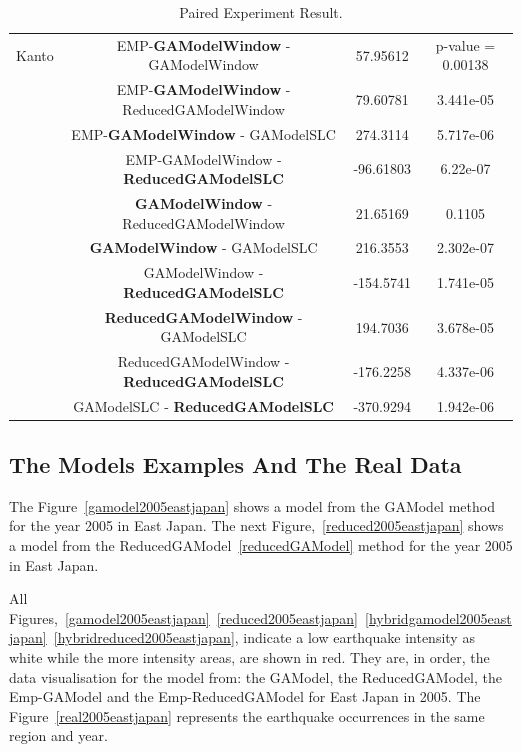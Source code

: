 \begin{table}[!htb]
\begin{center}
\begin{tabular}{|c|c|c|c|}
			
			\hline
			Kanto & EMP-\textbf{GAModelWindow} - GAModelWindow &
			57.95612 & p-value = 0.00138\\
			& EMP-\textbf{GAModelWindow} - ReducedGAModelWindow &
			79.60781 & 3.441e-05\\
			& EMP-\textbf{GAModelWindow} - GAModelSLC &
			274.3114  & 5.717e-06\\
			& EMP-GAModelWindow - \textbf{ReducedGAModelSLC} & 
			-96.61803  & 6.22e-07\\
			& \textbf{GAModelWindow} - ReducedGAModelWindow & 
			21.65169  & 0.1105\\
			&\textbf{GAModelWindow} - GAModelSLC &
			216.3553  & 2.302e-07\\
			& GAModelWindow - \textbf{ReducedGAModelSLC} &
			-154.5741  & 1.741e-05\\
			& \textbf{ReducedGAModelWindow} - GAModelSLC &
			194.7036  & 3.678e-05\\
			& ReducedGAModelWindow -\textbf{ReducedGAModelSLC} &
			-176.2258 & 4.337e-06\\
			& GAModelSLC - \textbf{ReducedGAModelSLC} &
			-370.9294 &1.942e-06\\
			\hline
		\end{tabular}
	\end{center}
	\caption{Paired Experiment Result.}
	\label{Paired}
\end{table}



\subsection{The Models Examples And The Real Data}

The Figure~\ref{gamodel2005eastjapan} shows a model from the GAModel method for the year 2005 in East Japan. The next Figure,~\ref{reduced2005eastjapan} shows a model from the ReducedGAModel~\ref{reducedGAModel} method for the year 2005 in East Japan.

All Figures,~\ref{gamodel2005eastjapan}~\ref{reduced2005eastjapan}~\ref{hybridgamodel2005eastjapan}~\ref{hybridreduced2005eastjapan},  indicate a low earthquake intensity as white while the more intensity areas, are shown in red. They are, in order, the data visualisation for the model from: the GAModel, the ReducedGAModel, the Emp-GAModel and the Emp-ReducedGAModel for East Japan in 2005. The Figure~\ref{real2005eastjapan} represents the earthquake occurrences in the same region and year.


